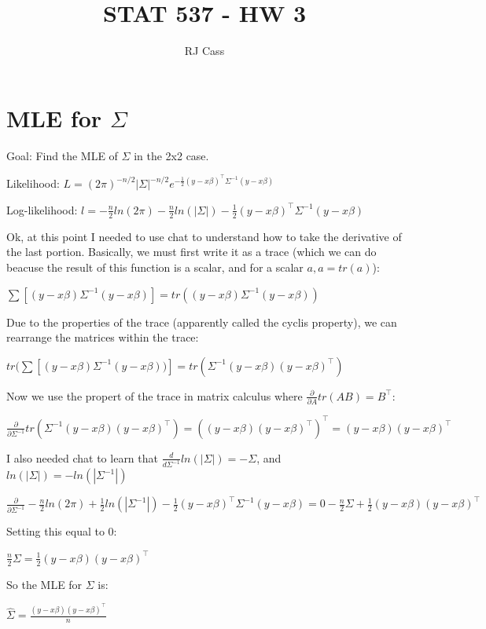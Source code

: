 \documentclass{article}
\author{RJ Cass}
\title{STAT 537 - HW 3}
\let\Oldsum=\sum
\renewcommand{\sum}{\Oldsum\limits}
\begin{document}
\maketitle

\section{MLE for $\Sigma$}

Goal: Find the MLE of $\Sigma$ in the 2x2 case.

Likelihood: $L = (2\pi)^{-n/2}|\Sigma|^{-n/2}e^{-\frac{1}{2}(y-x\beta)^{\top}\Sigma^{-1}(y-x\beta)}$

Log-likelihood: $l = -\frac{n}{2}ln(2\pi) - \frac{n}{2}ln(|\Sigma|) - \frac{1}{2}(y-x\beta)^{\top}\Sigma^{-1}(y-x\beta)$

Ok, at this point I needed to use chat to understand how to take the derivative of the last portion. Basically, we must first write it as a trace (which we can do beacuse the result of this function is a scalar, and for a scalar $a, a = tr(a)$):

$\sum[(y-x\beta)\Sigma^{-1}(y-x\beta)] = tr((y-x\beta)\Sigma^{-1}(y-x\beta))$

Due to the properties of the trace (apparently called the cyclis property), we can rearrange the matrices within the trace:

$tr(\sum[(y-x\beta)\Sigma^{-1}(y-x\beta))] = tr(\Sigma^{-1}(y-x\beta)(y-x\beta)^{\top})$

Now we use the propert of the trace in matrix calculus where $\frac{\partial}{\partial A} tr(AB) = B^{\top}$:

$\frac{\partial}{\partial \Sigma^{-1}} tr(\Sigma^{-1}(y-x\beta)(y-x\beta)^{\top}) = ((y-x\beta)(y-x\beta)^{\top})^{\top} = (y-x\beta)(y-x\beta)^{\top}$

I also needed chat to learn that $\frac{d}{d \Sigma^{-1}} ln(|\Sigma|) = -\Sigma$, and $ln(|\Sigma|) = -ln(|\Sigma^{-1}|)$

$\frac{\partial}{\partial \Sigma^{-1}} -\frac{n}{2}ln(2\pi) + \frac{1}{2}ln(|\Sigma^{-1}|) - \frac{1}{2}(y-x\beta)^{\top}\Sigma^{-1}(y-x\beta) = 0 - \frac{n}{2}\Sigma + \frac{1}{2}(y-x\beta)(y-x\beta)^{\top}$

Setting this equal to 0:

$\frac{n}{2}\Sigma = \frac{1}{2}(y-x\beta)(y-x\beta)^{\top}$

So the MLE for $\Sigma$ is:

$\hat{\Sigma} = \frac{(y-x\beta)(y-x\beta)^{\top}}{n}$
\end{document}
